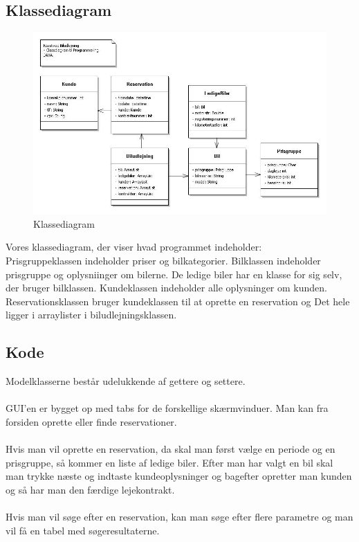 \documentclass[11pt]{article}
\begin{document}
\subsection*{Klassediagram}
\begin{figure}
  \centering
  \includegraphics[width=15cm]{Classdiagram_prog.jpg}
  \caption{Klassediagram}
  \label{fig:Klassediagram}
\end{figure}

Vores klassediagram, der viser hvad programmet indeholder:\\
Prisgruppeklassen indeholder priser og bilkategorier. Bilklassen indeholder prisgruppe og oplysniinger om bilerne. De ledige biler har en klasse for sig selv, der bruger bilklassen. Kundeklassen indeholder alle oplysninger om kunden. Reservationsklassen bruger kundeklassen til at oprette en reservation og Det hele ligger i arraylister i biludlejningsklassen.

\subsection*{Kode}
Modelklasserne består udelukkende af gettere og settere.\\\\
GUI'en er bygget op med tabs for de forskellige skærmvinduer. Man kan fra forsiden oprette eller finde reservationer.\\\\
Hvis man vil oprette en reservation, da skal man først vælge en periode og en prisgruppe, så kommer en liste af ledige biler. Efter man har valgt en bil skal man trykke næste og indtaste kundeoplysninger og bagefter opretter man kunden og så har man den færdige lejekontrakt.\\\\
Hvis man vil søge efter en reservation, kan man søge efter flere parametre og man vil få en tabel med søgeresultaterne.
\end{document}
